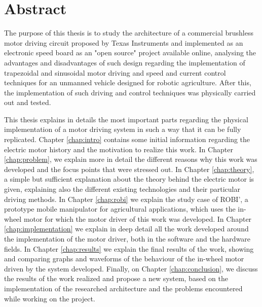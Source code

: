 
\begingroup
\let\clearpage\relax
\let\cleardoublepage\relax
\let\cleardoublepage\relax

\chapter*{Abstract}

The purpose of this thesis is to study the architecture of a commercial brushless motor driving circuit proposed by Texas Instruments and implemented as an electronic speed board as an "open source" project available online, analysing the advantages and disadvantages of such design regarding the implementation of trapezoidal and sinusoidal motor driving and speed and current control techniques for an unmanned vehicle designed for robotic agriculture. After this, the implementation of such driving and control techniques was physically carried out and tested.

This thesis explains in details the most important parts regarding the physical implementation of a motor driving system in such a way that it can be fully replicated. Chapter \ref{chap:intro} contains some initial information regarding the electric motor history and the motivation to realize this work. In Chapter \ref{chap:problem}, we explain more in detail the different reasons why this work was developed and the focus points that were stressed out. In Chapter \ref{chap:theory}, a simple but sufficient explanation about the theory behind the electric motor is given, explaining also the different existing technologies and their particular driving methods. In Chapter \ref{chap:robi} we explain the study case of ROBI', a prototype mobile manipulator for agricultural applications, which uses the in-wheel motor for which the motor driver of this work was developed. In Chapter \ref{chap:implementation} we explain in deep detail all the work developed around the implementation of the motor driver, both in the software and the hardware fields. In Chapter \ref{chap:results} we explain the final results of the work, showing and comparing graphs and waveforms of the behaviour of the in-wheel motor driven by the system developed. Finally, on Chapter \ref{chap:conclusion}, we discuss the results of the work realized and propose a new system, based on the implementation of the researched architecture and the problems encountered while working on the project.


\vfill
\endgroup